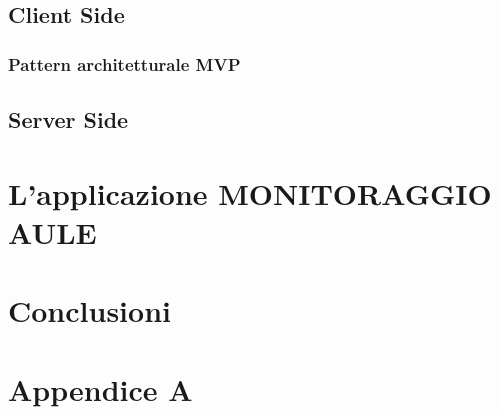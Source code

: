 \documentclass[a4paper,pt11,oneside]{book}
\begin{document}
\section{Client Side}

\subsection{Pattern architetturale MVP}



\section{Server Side}


\chapter{L'applicazione MONITORAGGIO AULE}



\chapter{Conclusioni}

\chapter{Appendice A}


\end{document}
